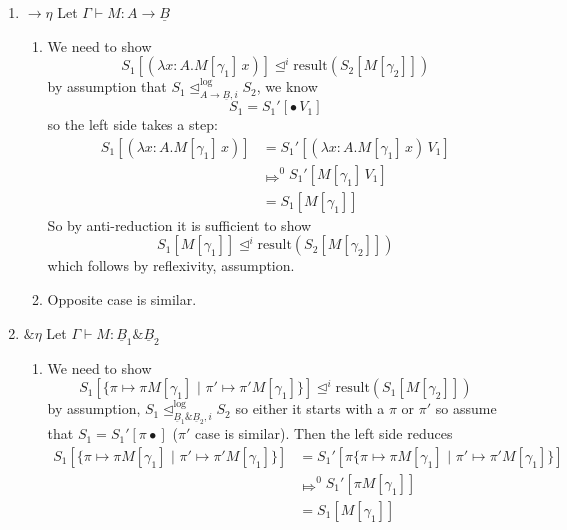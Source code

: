 \documentclass[acmsmall,screen,12pt]{acmart}
\renewcommand{\u}{\underline}
\newcommand{\pipe}{\,\,|\,\,}
\newcommand{\apreorder}{\trianglelefteq}
\newcommand{\ix}[2]{\mathrel{#1^{#2}}}
\newcommand{\itylrof}[3]{\ilrof{#1}{#3,#2}}
\newcommand{\ilrof}[2]{\mathrel{{#1}^{\text{log}}_{#2}}}
\newcommand{\itylr}[2]{\itylrof{\apreorder}{#1}{#2}}
\newcommand{\bigstepsin}[1]{\mathrel{\Mapsto^{#1}}}
\newcommand{\pair}[2]{\{ \pi \mapsto {#1} \pipe \pi' \mapsto {#2}\}}
\newcommand{\result}{\text{result}}
\newcommand{\bindXtoYinZ}[2]{\kw{bind}#2 \leftarrow #1;}
\newcommand{\kw}[1]{\texttt{#1}\,\,}
\newcommand{\ret}{\kw{ret}}
\newcommand{\with}{\mathbin{\&}}
\begin{document}
{\begin{longproof}
\begin{enumerate}
\begin{enumerate}
      So assume $V_1 \itylr j A V_2$ for some $j\leq i$, then we need to show
      \[ S_1[\bindXtoYinZ \bullet {\ret V_1} \ret x] \ix\apreorder j \result(S_2[\ret V_2])
      \]
      The left side takes a step:
      \[ S_1[\bindXtoYinZ \bullet {\ret V_1} \ret x] \bigstepsin{0} S_1[\ret V_1]\]
      so by anti-reduction it is sufficient to show
      \[ S_1[\ret V_1] \ix\apreorder j \result(S_2[\ret V_2])\]
      which follows by assumption
    \item Opposite case is similar.
    \end{enumerate}
  \item $\to\eta$ Let $\Gamma \vdash M : A \to \u B$
    \begin{enumerate}
    \item We need to show
      \[ S_1[(\lambda x:A. M[\gamma_1]\, x)] \ix\apreorder i \result(S_2[M[\gamma_2]])
      \]
      by assumption that $S_1 \itylr i {A \to \u B} S_2$, we know
      \[ S_1 = S_1'[\bullet\, V_1]\]
      so the left side takes a step:
      \begin{align*}
         S_1[(\lambda x:A. M[\gamma_1]\, x)]
         &= S_1'[(\lambda x:A. M[\gamma_1]\, x)\, V_1]\\
         &\bigstepsin{0} S_1'[M[\gamma_1]\, V_1]\\
         &= S_1[M[\gamma_1]]
      \end{align*}
      So by anti-reduction it is sufficient to show
      \[ S_1[M[\gamma_1]] \ix\apreorder i \result(S_2[M[\gamma_2]])\]
      which follows by reflexivity, assumption.
    \item Opposite case is similar.
    \end{enumerate}
  \item $\with\eta$ Let $\Gamma \vdash M : \u B_1 \with \u B_2$
    \begin{enumerate}
    \item We need to show
      \[ S_1[\pair{\pi M[\gamma_1]}{\pi' M[\gamma_1]}] \ix\apreorder i \result(S_1[M[\gamma_2]]) \]
      by assumption, $S_1 \itylr i {\u B_1 \with \u B_2} S_2$ so
      either it starts with a $\pi$ or $\pi'$ so assume that $S_1 =
      S_1'[\pi \bullet]$ ($\pi'$ case is similar).
      Then the left side reduces
      \begin{align*}
        S_1[\pair{\pi M[\gamma_1]}{\pi' M[\gamma_1]}]
        &= S_1'[\pi\pair{\pi M[\gamma_1]}{\pi' M[\gamma_1]}]\\
        &\bigstepsin{0} S_1'[\pi M[\gamma_1]]\\
        &= S_1[M[\gamma_1]]

\end{align*}
\end{enumerate}
\end{enumerate}
\end{longproof}}
\end{document}
